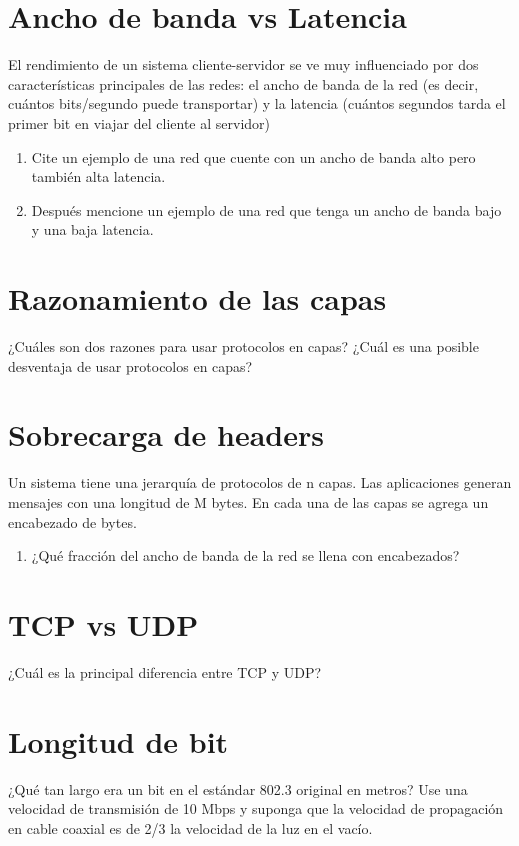 \documentclass[12pt]{report}
\begin{document}
\section{Ancho de banda vs Latencia \stwo}
El rendimiento de un sistema cliente-servidor se ve muy influenciado por dos características principales de las redes: el ancho de banda de la red (es decir, cuántos bits/segundo puede transportar) y la latencia (cuántos segundos tarda el primer bit en viajar del cliente al servidor)

\begin{enumerate}
\item Cite un ejemplo de una red que cuente con un ancho de banda alto pero también alta latencia.
\item Después mencione un ejemplo de una red que tenga un ancho de banda bajo y una baja latencia.
\end{enumerate}

\section{Razonamiento de las capas \stwo}
¿Cuáles son dos razones para usar protocolos en capas? ¿Cuál es una posible desventaja de usar protocolos en capas?

\section{Sobrecarga de headers \sthree}
Un sistema tiene una jerarquía de protocolos de n capas. Las aplicaciones generan mensajes con una longitud de M bytes. En cada una de las capas se agrega un encabezado de  bytes.

\begin{enumerate}
\item ¿Qué fracción del ancho de banda de la red se llena con encabezados?
\end{enumerate}

\section{TCP vs UDP \sone}
¿Cuál es la principal diferencia entre TCP y UDP?

\section{Longitud de bit \sthree}
¿Qué tan largo era un bit en el estándar 802.3 original en metros? Use una velocidad de transmisión de 10 Mbps y suponga que la velocidad de propagación en cable coaxial es de 2/3 la velocidad de la luz en el vacío.
\end{document}
